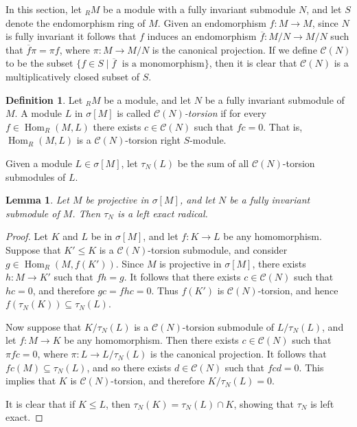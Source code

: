 \documentclass{amsart}
\newtheorem{lemma}[thm]{Lemma}
\theoremstyle{definition}
\newtheorem{defn}[thm]{Definition}
\theoremstyle{remark}
\numberwithin{equation}{section}
\DeclareMathOperator{\Hom}{Hom}
\newcommand{\sm}{\sigma[M]}
\begin{document}
In this section,
let $_R M$ be a module with a fully invariant submodule $N$,
and let $S$ denote the endomorphism ring of $M$. 
Given an endomorphism $f:M\to M$, 
since $N$ is fully invariant 
it follows that $f$ induces an endomorphism 
$\overline{f}:M/N\to M/N$ such that $\overline{f}\pi=\pi f$, 
where $\pi:M\to M/N$ is the canonical projection. 
If we define $\mathcal{C}(N)$ to be the subset
$\{f\in S\mid \overline{f}\;\text{ is a monomorphism}\}$,
then it is clear that
$\mathcal{C}(N)$ is a multiplicatively closed subset of $S$.

\begin{defn}
	Let $_R M$ be a module, and let $N$ be a fully invariant submodule of $M$. 
	A module $L$ in $\sm$ is called 
	\emph{$\mathcal{C}(N)$-torsion} 
	if for every $f\in\Hom_R(M,L)$ there exists $c\in\mathcal{C}(N)$ 
	such that $fc=0$. 
	That is, $\Hom_R(M,L)$ is a $\mathcal{C}(N)$-torsion right $S$-module.
\end{defn}

Given a module $L\in\sm$, 
let $\tau_N(L)$ be the sum of all 
$\mathcal{C}(N)$-torsion submodules of $L$. 

\begin{lemma}\label{prad}
	Let $M$ be projective in $\sm$, 
	and let $N$ be a fully invariant submodule of $M$. 
	Then $\tau_N$ is a left exact radical.
\end{lemma}

\begin{proof}
	Let $K$ and $L$ be in $\sm$, 
	and let $f:K\to L$ be any homomorphism. 
	Suppose that $K'\leq K$ is a $\mathcal{C}(N)$-torsion submodule, 
	and consider $g\in\Hom_R(M,f(K'))$. 
	Since $M$ is projective in $\sm$, 
	there exists $h:M\to K'$ such that $fh=g$. 
	It follows that there exists $c\in\mathcal{C}(N)$ such that $hc=0$, 
	and therefore $gc=fhc=0$. 
	Thus $f(K')$ is $\mathcal{C}(N)$-torsion,
	and hence $f(\tau_N(K))\subseteq \tau_N(L)$. 
	
	Now suppose that $K/\tau_N(L)$ 
	is a $\mathcal{C}(N)$-torsion submodule of $L/\tau_N(L)$, 
	and let $f:M\to K$ be any homomorphism. 
	Then there exists $c\in\mathcal{C}(N)$ such that $\pi fc=0$,
	where $\pi:L\to L/\tau_N(L)$ is the canonical projection. 
	It follows that $fc(M)\subseteq \tau_N(L)$, 
	and so there exists $d\in\mathcal{C}(N)$ such that $fcd=0$. 
	This implies that $K$ is $\mathcal{C}(N)$-torsion,
	and therefore $K/\tau_N(L)=0$. 
	
	It is clear that if $K\leq L$, then $\tau_N(K)=\tau_N(L)\cap K$, 
	showing that $\tau_N$ is left exact.
\end{proof}
\end{document}
